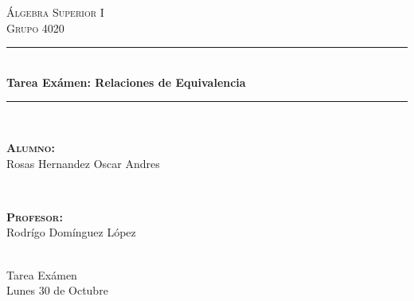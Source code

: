 \documentclass[12pt, fleqn]{article}                             %
\author{Oscar Andrés Rosas}                                     %
\begin{document}
\begin{titlepage}

    \center
    \textsc{\Large Álgebra Superior I}\\[0.5cm] 
    \textsc{\large Grupo 4020}\\[1.5cm]

    \rule{\linewidth}{0.5mm} \\[1.0cm]
        { \huge \bfseries Tarea Exámen: Relaciones de Equivalencia}\\[1.0cm] 
    \rule{\linewidth}{0.5mm} \\[2.0cm]
     
    \begin{minipage}{0.4\textwidth}
        \begin{flushleft} \large
            \textbf{\textsc{Alumno:}}\\
            Rosas Hernandez Oscar Andres
        \end{flushleft}
    \end{minipage}
    ~
    \begin{minipage}{0.4\textwidth}
        \begin{flushright} \large
            \textbf{\textsc{Profesor: }}\\
            Rodrígo Domínguez López
        \end{flushright}
    \end{minipage}\\[3,5cm]

    {\LARGE Tarea Exámen}\\[4cm] 
    
    
    {\large Lunes 30 de Octubre}\\[2cm] 

    \vfill

\end{titlepage}

\tableofcontents{}
\label{sec:Index}

\clearpage




\end{document}
